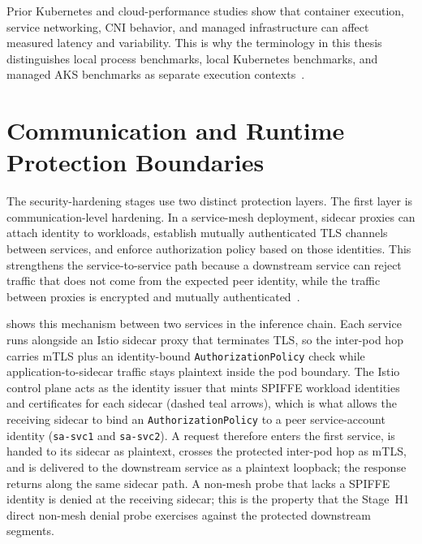 Prior Kubernetes and cloud-performance studies show that container execution, service
networking, CNI behavior, and managed infrastructure can affect measured latency and
variability. This is why the terminology in this thesis distinguishes local process
benchmarks, local Kubernetes benchmarks, and managed AKS benchmarks as separate
execution contexts~\cite{managed_k8s_perf,cni_k8s_ic2e21,noise_in_clouds}.

\section{Communication and Runtime Protection Boundaries}
\label{sec:bg-security-boundaries}

The security-hardening stages use two distinct protection layers. The first layer is
communication-level hardening. In a service-mesh deployment, sidecar proxies can attach
identity to workloads, establish mutually authenticated TLS channels between services,
and enforce authorization policy based on those identities. This strengthens the
service-to-service path because a downstream service can reject traffic that does not
come from the expected peer identity, while the traffic between proxies is encrypted and
mutually authenticated~\cite{ashraf2025policy_workflow,bremlerbarr2025mtls}.

 shows this mechanism between two services in
the inference chain. Each service runs alongside an Istio sidecar proxy that
terminates TLS, so the inter-pod hop carries mTLS plus an identity-bound
\texttt{AuthorizationPolicy} check while application-to-sidecar traffic stays
plaintext inside the pod boundary. The Istio control plane acts as the identity
issuer that mints SPIFFE workload identities and certificates for each sidecar
(dashed teal arrows), which is what allows the receiving sidecar to bind an
\texttt{AuthorizationPolicy} to a peer service-account identity (\texttt{sa-svc1}
and \texttt{sa-svc2}). A request therefore enters the first service, is handed to
its sidecar as plaintext, crosses the protected inter-pod hop as mTLS, and is
delivered to the downstream service as a plaintext loopback; the response returns
along the same sidecar path. A non-mesh probe that lacks a SPIFFE identity is
denied at the receiving sidecar; this is the property that the Stage~H1 direct
non-mesh denial probe exercises against the protected downstream segments.

